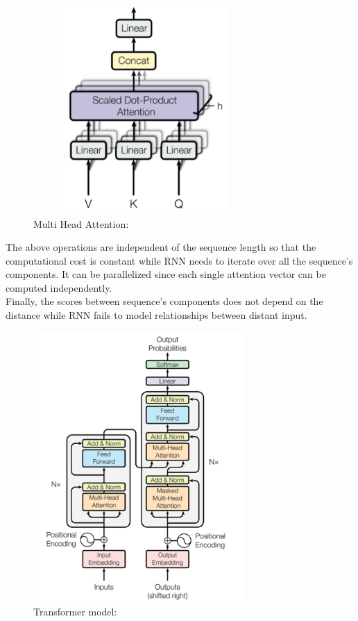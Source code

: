 \documentclass[LaM,binding=0.6cm]{sapthesis}
\begin{document}
\begin{figure}[H]  \centering
    \includegraphics[width=80mm,scale=0.7]{mhsa}
    \caption{Multi Head Attention: \cite{aiayn}}
    \label{fig:mhsa}
\end{figure}
The above operations are independent of the sequence length so that the computational cost is constant while RNN needs to iterate over all the sequence's components. It can be parallelized since each single attention vector can be computed independently.\\Finally, the scores between sequence's components does not depend on the distance while RNN fails to model relationships between distant input.
\begin{figure}[H]  \centering
    \includegraphics[width=80mm,scale=1]{transflay}
    \caption{Transformer model: \cite{aiayn}}
    \label{fig:tramodel}
\end{figure}
\end{document}
